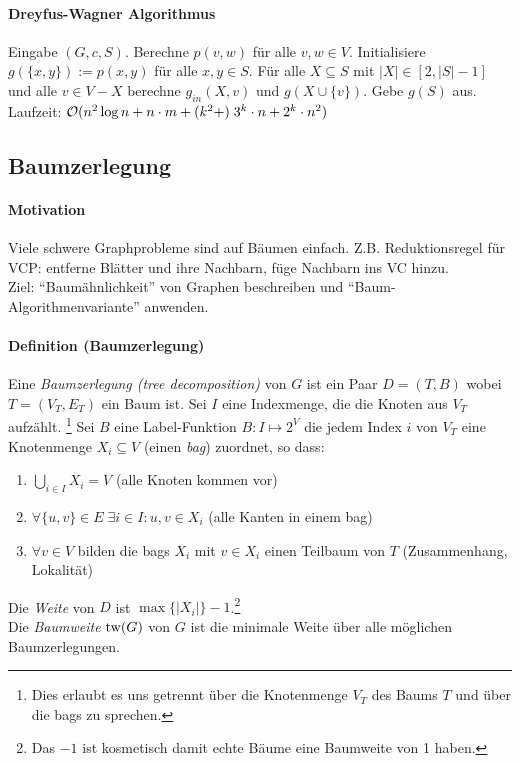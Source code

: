 \paragraph{Dreyfus-Wagner Algorithmus}
Eingabe $(G, c, S)$.
Berechne $p(v, w)$ für alle $v,w \in V$.
Initialisiere $g(\{x,y\}) := p(x,y)$ für alle $x,y \in S$.
Für alle $X \subseteq S$ mit $|X| \in [2, |S|-1]$ und alle $v \in V-X$ berechne $g_{in}(X, v)$ und $g(X \cup \{v\})$.
Gebe $g(S)$ aus.
\\
Laufzeit: $\mathcal{O} (n^2 \log n + n \cdot m + (k^2 + )\; 3^k \cdot n + 2^k \cdot n^2)$


\subsection{Baumzerlegung}

\paragraph{Motivation}
Viele schwere Graphprobleme sind auf Bäumen einfach.
Z.B. Reduktionsregel für VCP: entferne Blätter und ihre Nachbarn, füge Nachbarn ins VC hinzu.
\\
Ziel: ``Baumähnlichkeit'' von Graphen beschreiben und ``Baum-Algorithmenvariante'' anwenden.

\paragraph{Definition (Baumzerlegung)}
Eine \emph{Baumzerlegung (tree decomposition)} von $G$ ist ein Paar $D = (T, B)$
wobei $T = (V_T, E_T)$ ein Baum ist.
Sei $I$ eine Indexmenge, die die Knoten aus $V_T$ aufzählt.%
\footnote{Dies erlaubt es uns getrennt über die Knotenmenge $V_T$ des Baums $T$ und über die bags zu sprechen.}
Sei $B$ eine Label-Funktion $B : I \mapsto 2^V$ die jedem Index $i$ von $V_T$ eine Knotenmenge $X_i \subseteq V$
(einen \emph{bag}) zuordnet, so dass:
\begin{enumerate}[label=(\roman*)]
    \item $ \bigcup_{i \in I} X_i = V $ (alle Knoten kommen vor)
    \item $ \forall \{u,v\} \in E \; \exists i \in I : u, v \in X_i $ (alle Kanten in einem bag)
    \item $ \forall v \in V $ bilden die bags $X_i$ mit $v \in X_i$ einen Teilbaum von $T$ (Zusammenhang, Lokalität)
\end{enumerate}

Die \emph{Weite} von $D$ ist $\max \{|X_i|\} - 1$.\footnote{Das $-1$ ist kosmetisch damit echte Bäume eine Baumweite von 1 haben.} \\
Die \emph{Baumweite} $\text{tw}(G)$ von $G$ ist die minimale Weite über alle möglichen Baumzerlegungen.

